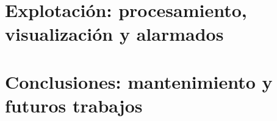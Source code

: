 \documentclass[12pt,a4paper,twoside]{book}
\begin{document}
\part{Explotación: procesamiento, visualización y alarmados}
%
%
%


\part{Conclusiones: mantenimiento y futuros trabajos }
%


%







%
\end{document}
